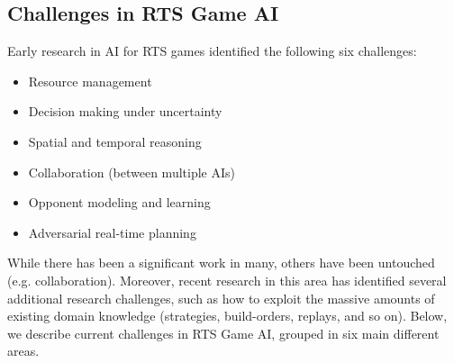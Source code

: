 \documentclass[journal]{IEEEtran}
\begin{document}
\subsection{Challenges in RTS Game AI}\label{subsec:challenges}

Early research in AI for RTS games \cite{Buro03rts} identified the following six challenges: 
\begin{itemize}
\item Resource management
\item Decision making under uncertainty
\item Spatial and temporal reasoning
\item Collaboration (between multiple AIs)
\item Opponent modeling and learning
\item Adversarial real-time planning
\end{itemize}

While there has been a significant work in many, others have been untouched (e.g. collaboration). Moreover, recent research in this area has identified several additional research challenges, such as how to exploit the massive amounts of existing domain knowledge (strategies, build-orders, replays, and so on). Below, we describe current challenges in RTS Game AI, grouped in six main different areas.

\end{document}
